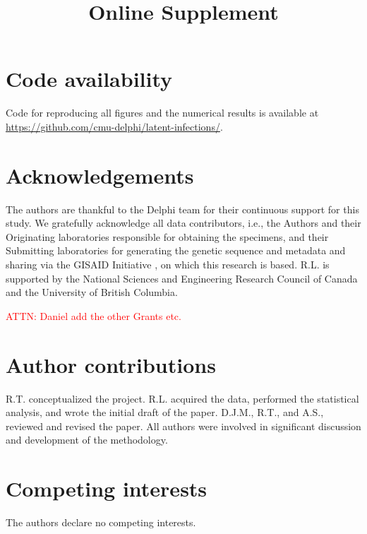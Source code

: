 \documentclass{article}
\newcommand{\beginsupplement}{
  \setcounter{table}{0}  
  \renewcommand{\thetable}{S\arabic{table}} 
  \setcounter{figure}{0} 
  \renewcommand{\thefigure}{S\arabic{figure}}
  \setcounter{section}{0} 
  \renewcommand{\thesection}{S\arabic{section}}
}
\newcommand{\attn }[1]{\textcolor{red}{ATTN: #1}}
\begin{document}
\section*{Code availability}
Code for reproducing all figures and the numerical results is 
available at 
\href{https://github.com/cmu-delphi/latent-infections/}{https://github.com/cmu-delphi/latent-infections/}.

\clearpage
%




\section*{Acknowledgements}

The authors are thankful to the Delphi team for their continuous support for this study. 
We gratefully acknowledge all data contributors, i.e., the Authors and their
Originating laboratories responsible for obtaining the specimens, and their
Submitting laboratories for generating the genetic sequence and metadata and
sharing via the GISAID Initiative \citep{elbe2017data}, on which this research
is based. %
R.L. is supported by the National Sciences and Engineering Research Council of 
Canada and the University of British Columbia.

\attn{Daniel add the other Grants etc.}

\section*{Author contributions}
R.T. conceptualized the project. R.L. acquired the data, performed the statistical 
analysis, and wrote the initial draft of the paper. D.J.M., R.T., and A.S., reviewed 
and revised the paper. All authors were involved in significant discussion and 
development of the methodology.

\section*{Competing interests}

The authors declare no competing interests.

\clearpage
\beginsupplement
\title{\supptitlefont Online Supplement}
\maketitle


\end{document}
